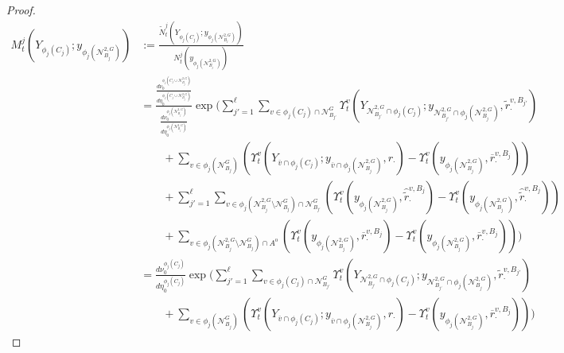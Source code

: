 \documentclass[12pt]{article}
\newcommand{\mc}{\mathcal}
\newcommand{\ov}{\overline}
\newcommand{\defeq}{:=}								%
\newcommand{\gneigh}[2]{\mc{N}^{#1}_{#2}}			%
\newcommand{\dgneigh}[2]{\mc{N}^{2,#1}_{#2}}		%
\newcommand{\cl}[1]{\ov{#1}}						%
\newcommand{\rate}{r}								%
\newcommand{\xg}{y}									%
\newcommand{\vind}[1]{_{#1}}						%
\newcommand{\vpara}[1]{^{#1}}						%
\newcommand{\stpara}[1]{_{#1}}						%
\newcommand{\tpara}[1]{_{#1}}						%
\newcommand{\psize}{\ell}							%
\newcommand{\Xg}{Y}									%
\newcommand{\brate}{\alt{\rate}}					%
\newcommand{\inte}[1]{{#1}^\mathrm{o}}				%
\newcommand{\alt}[1]{\tilde{#1}}					%
\newcommand{\mm}{\nu}								%
\newcommand{\bgrate}{\ov{\rate}}					%
\newcommand{\bcrate}{\hat{\brate}}					%
\newcommand{\mmm}{\eta}								%
\newcommand{\ds}{\Upsilon}							%
\newcommand{\densen}{N}								%
\newcommand{\denseph}{\alt{N}}						%
\newcommand{\mdense}{M}								%
\newcommand{\jpara}[1]{^{#1}}						%
\newcommand{\vjpara}[2]{^{#1,#2}}					%
\begin{document}
\begin{proof}
\begin{align}
\mdense\jpara{j}\tpara{t}(\Xg\vind{\phi_j(C_j)};\xg\vind{\phi_j(\dgneigh{G}{B_j})}) &\defeq \frac{\denseph\jpara{j}\tpara{t}(\Xg\vind{\phi_j(C_j)};\xg\vind{\phi_j(\dgneigh{G}{B_j})})}{\densen\jpara{j}\tpara{t}(\xg\vind{\phi_j(\dgneigh{G}{B_j})})}\nonumber\\
&= \frac{\frac{d\mm\vpara{\phi_j(C_j\cup \dgneigh{G}{B_j})}\tpara{0}}{d\mmm\vpara{\phi_j(C_j\cup \dgneigh{G}{B_j})}\tpara{0}}}{\frac{d\mm\vpara{\phi_j(\dgneigh{G}{B_j})}\tpara{0}}{d\mmm\vpara{\phi_j(\dgneigh{G}{B_j})}\tpara{0}}}\exp\Bigg(\sum_{j' = 1}^{\psize}\sum_{v \in \phi_j(C_j)\cap\gneigh{G}{B_{j'}}} \ds\vpara{v}\tpara{t}\left(\Xg\vind{\dgneigh{G}{B_{j'}}\cap\phi_j(C_j)};\xg\vind{\dgneigh{G}{B_{j'}}\cap\phi_j(\dgneigh{G}{B_j})},\brate\vjpara{v}{B_{j'}}\stpara{\cdot}\right)\nonumber\\
&\hspace{24pt} + \sum_{v \in \phi_j(\gneigh{G}{B_j})} \left(\ds\vpara{v}\tpara{t}\left(\Xg\vind{\cl{v}\cap\phi_j(C_j)};\xg\vind{\cl{v}\cap\phi_j(\dgneigh{G}{B_j})},\rate\stpara{\cdot}\right) - \ds\vpara{v}\tpara{t}\left(\xg\vind{\phi_j(\dgneigh{G}{B_j})},\bgrate\vjpara{v}{B_j}\stpara{\cdot}\right)\right)\nonumber\\
&\hspace{24pt} +  \sum_{j'=1}^\psize \sum_{v \in \phi_j(\dgneigh{G}{B_j}\setminus\gneigh{G}{B_j})\cap \gneigh{G}{B_{j'}}} \left(\ds\vpara{v}\tpara{t}\left(\xg\vind{\phi_j(\dgneigh{G}{B_j})},\bcrate\vjpara{v}{B_j}\stpara{\cdot}\right) - \ds\vpara{v}\tpara{t}\left(\xg\vind{\phi_j(\dgneigh{G}{B_j})},\bcrate\vjpara{v}{B_j}\stpara{\cdot}\right)\right)\nonumber\\
&\hspace{24pt} +  \sum_{v \in \phi_j(\dgneigh{G}{B_j}\setminus\gneigh{G}{B_j})\cap\inte{A}} \left(\ds\vpara{v}\tpara{t}\left(\xg\vind{\phi_j(\dgneigh{G}{B_j})},\bgrate\vjpara{v}{B_j}\stpara{\cdot}\right) - \ds\vpara{v}\tpara{t}\left(\xg\vind{\phi_j(\dgneigh{G}{B_j})},\bgrate\vjpara{v}{B_j}\stpara{\cdot}\right)\right)\Bigg)\nonumber\\
&= \frac{d\mm\vpara{\phi_j(C_j)}\tpara{0}}{d\mmm\vpara{\phi_j(C_j)}\tpara{0}}\exp\Bigg(\sum_{j' = 1}^{\psize}\sum_{v \in \phi_j(C_j)\cap\gneigh{G}{B_{j'}}} \ds\vpara{v}\tpara{t}\left(\Xg\vind{\dgneigh{G}{B_{j'}}\cap\phi_j(C_j)};\xg\vind{\dgneigh{G}{B_{j'}}\cap\phi_j(\dgneigh{G}{B_j})},\brate\vjpara{v}{B_{j'}}\stpara{\cdot}\right)\nonumber\\
&\hspace{24pt} + \sum_{v \in \phi_j(\gneigh{G}{B_j})} \left(\ds\vpara{v}\tpara{t}\left(\Xg\vind{\cl{v}\cap\phi_j(C_j)};\xg\vind{\cl{v}\cap\phi_j(\dgneigh{G}{B_j})},\rate\stpara{\cdot}\right) - \ds\vpara{v}\tpara{t}\left(\xg\vind{\phi_j(\dgneigh{G}{B_j})},\bgrate\vjpara{v}{B_j}\stpara{\cdot}\right)\right)\Bigg)
\label{Uq::M}
\end{align}


\end{proof}
\end{document}
